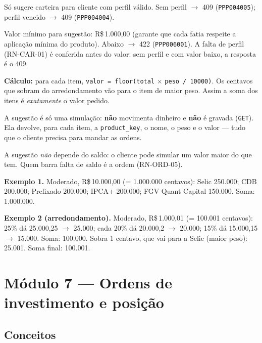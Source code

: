 \documentclass[11pt,a4paper]{article}
\newcommand{\fundo}{FGV Quant Capital}     %
\newcommand{\obr}{\textbf{[OBR]}}          %
\newcommand{\dec}{\textbf{[DEC]}}          %
\newcommand{\rs}{R\$\,}
\newcommand{\tb}[1]{\texttt{#1}}           %
\begin{document}
\begin{regras}
  \item[RN-CAR-01 \obr] Só sugere carteira para cliente com perfil válido. Sem perfil $\to$ 409
  (\tb{PPP004005}); perfil vencido $\to$ 409 (\tb{PPP004004}).
  \item[RN-CAR-02 \dec] Valor mínimo para sugestão: \rs 1.000,00 (garante que cada fatia respeite a
  aplicação mínima do produto). Abaixo $\to$ 422 (\tb{PPP006001}). A falta de perfil (RN-CAR-01)
  é conferida antes do valor: sem perfil e com valor baixo, a resposta é o 409.
  \item[RN-CAR-03 \dec] \textbf{Cálculo:} para cada item, \tb{valor = floor(total} $\times$
  \tb{peso / 10000)}. Os centavos que sobram do arredondamento vão para o item de maior peso.
  Assim a soma dos itens é \emph{exatamente} o valor pedido.
  \item[RN-CAR-04 \dec] A sugestão é só uma simulação: \textbf{não} movimenta dinheiro e
  \textbf{não} é gravada (\tb{GET}). Ela devolve, para cada item, a \tb{product_key}, o nome, o
  peso e o valor --- tudo que o cliente precisa para mandar as ordens.
  \item[RN-CAR-05 \dec] A sugestão \emph{não} depende do saldo: o cliente pode simular um valor
  maior do que tem. Quem barra falta de saldo é a ordem (RN-ORD-05).
\end{regras}

\textbf{Exemplo 1.} Moderado, \rs 10.000,00 (= 1.000.000 centavos): Selic 250.000; CDB 200.000;
Prefixado 200.000; IPCA+ 200.000; \fundo{} 150.000. Soma: 1.000.000.

\textbf{Exemplo 2 (arredondamento).} Moderado, \rs 1.000,01 (= 100.001 centavos): 25\% dá 25.000,25
$\to$ 25.000; cada 20\% dá 20.000,2 $\to$ 20.000; 15\% dá 15.000,15 $\to$ 15.000. Soma: 100.000.
Sobra 1 centavo, que vai para a Selic (maior peso): 25.001. Soma final: 100.001.

\section{Módulo 7 --- Ordens de investimento e posição}

\subsection{Conceitos}
\end{document}
